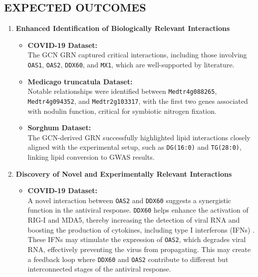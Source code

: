 \documentclass{article}
\begin{document}
\subsection{EXPECTED OUTCOMES}
\begin{enumerate}
    \item \textbf{Enhanced Identification of Biologically Relevant Interactions}
    \begin{itemize}
        \item \textbf{COVID-19 Dataset:} \\
        The GCN GRN captured critical interactions, including those involving \texttt{OAS1}, \texttt{OAS2}, \texttt{DDX60}, and \texttt{MX1}, which are well-supported by literature.
        
        \item \textbf{Medicago truncatula Dataset:} \\
        Notable relationships were identified between \texttt{Medtr4g088265}, \texttt{Medtr4g094352}, and \texttt{Medtr2g103317}, with the first two genes associated with nodulin function, critical for symbiotic nitrogen fixation.

        \item \textbf{Sorghum Dataset:} \\
        The GCN-derived GRN successfully highlighted lipid interactions closely aligned with the experimental setup, such as \texttt{DG(16:0)} and \texttt{TG(28:0)}, linking lipid conversion to GWAS results.
    \end{itemize}
    
    \item \textbf{Discovery of Novel and Experimentally Relevant Interactions}
    \begin{itemize}
        
        \item \textbf{COVID-19 Dataset:} \\
        A novel interaction between \texttt{OAS2} and \texttt{DDX60} suggests a synergistic function in the antiviral response. \texttt{DDX60} helps enhance the activation of RIG-I and MDA5, thereby increasing the detection of viral RNA and boosting the production of cytokines, including type I interferons (IFNs) \cite{kouwaki2021rig}. These IFNs may stimulate the expression of \texttt{OAS2}, which degrades viral RNA, effectively preventing the virus from propagating. This may create a feedback loop where \texttt{DDX60} and \texttt{OAS2} contribute to different but interconnected stages of the antiviral response.
        

\end{itemize}
\end{enumerate}
\end{document}

